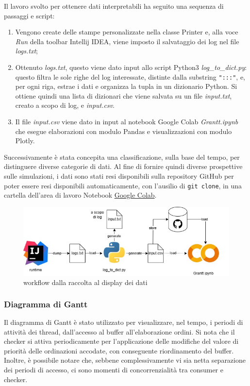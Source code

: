 Il lavoro svolto per ottenere dati interpretabili ha seguito una sequenza di passaggi e script:
\begin{enumerate}
	\item Vengono create delle stampe personalizzate nella classe Printer e, alla voce \textit{Run} della toolbar Intellij IDEA, viene imposto il salvataggio dei log nel file \textit{logs.txt};
	\item Ottenuto  \textit{logs.txt}, questo viene dato input allo script Python3 \textit{log\_to\_dict.py}: questo filtra le sole righe del log interessate, distinte dalla substring \texttt{":::"}, e, per ogni riga, estrae i dati e organizza la tupla in un dizionario Python. Si ottiene quindi una lista di dizionari che viene salvata su un file \textit{input.txt}, creato a scopo di log, e \textit{input.csv}.
	\item Il file \textit{input.csv} viene dato in input al notebook Google Colab \textit{Grantt.ipynb} che esegue elaborazioni con modulo Pandas e visualizzazioni con modulo Plotly.
\end{enumerate}
Successivamente è stata concepita una classificazione, sulla base del tempo, per distinguere diverse categorie di dati.
Al fine di fornire quindi diverse prospettive sulle simulazioni, i dati sono stati resi disponibili sulla repository GitHub per poter essere resi disponibili automaticamente, con l'ausilio di \texttt{git clone}, in una cartella dell'area di lavoro Notebook \href{https://colab.research.google.com/drive/1hyGN4p6SS00ENY7n0lPa2CBTDqbqRAC_?usp=sharing}{Google Colab}.

\begin{figure}[htbp]
	\centering
	\includegraphics[scale=0.35]{iterazione3/images/DataAnalisysThread.jpg}
	\caption{workflow dalla raccolta al display dei dati
 \label{fig:dataanalysisthread}}
\end{figure}

\subsubsection{Diagramma di Gantt}
Il diagramma di Gantt è stato utilizzato per visualizzare, nel tempo, i periodi di attività dei thread, dall'accesso al buffer all'elaborazione ordini. Si nota che il checker si attiva periodicamente per l'applicazione delle modifiche del valore di priorità delle ordinazioni accodate, con conseguente riordinamento del buffer.
Inoltre, è possibile notare che, sebbene complessivamente vi sia netta separazione dei periodi di accesso, ci sono momenti di concorrenzialità tra consumer e checker.

